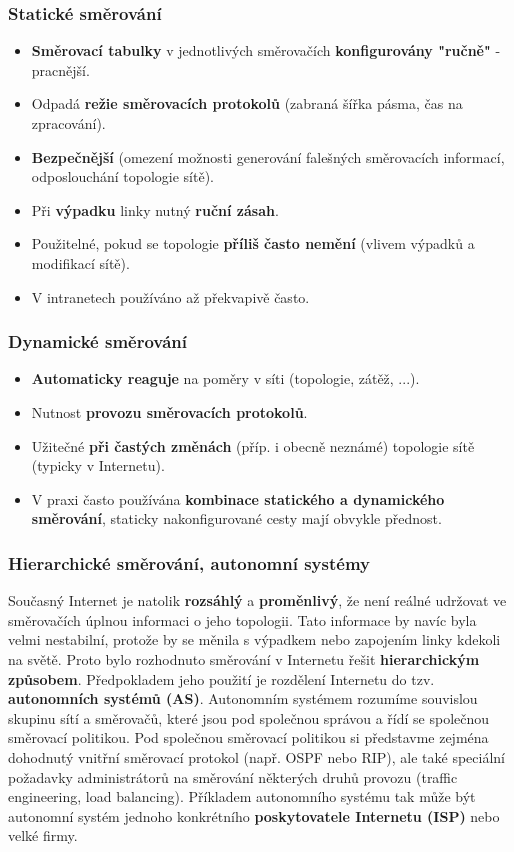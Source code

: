 \subsubsection{Statické směrování}
\begin{itemize}
\item \textbf{Směrovací tabulky} v jednotlivých směrovačích \textbf{konfigurovány "ručně"} - pracnější.
\item Odpadá \textbf{režie směrovacích protokolů} (zabraná šířka pásma, čas na zpracování).
\item \textbf{Bezpečnější} (omezení možnosti generování falešných směrovacích informací, odposlouchání topologie sítě).
\item Při \textbf{výpadku} linky nutný \textbf{ruční zásah}.
\item Použitelné, pokud se topologie \textbf{příliš často nemění} (vlivem výpadků a modifikací sítě).
\item V intranetech používáno až překvapivě často.
\end{itemize}

\subsubsection{Dynamické směrování}
\begin{itemize}
\item \textbf{Automaticky reaguje} na poměry v síti (topologie, zátěž, ...).
\item Nutnost\textbf{ provozu směrovacích protokolů}.
\item Užitečné \textbf{při častých změnách} (příp. i obecně neznámé) topologie sítě (typicky v Internetu).
\item V praxi často používána \textbf{kombinace statického a dynamického směrování}, staticky nakonfigurované cesty mají obvykle přednost.
\end{itemize}

\subsubsection{Hierarchické směrování, autonomní systémy}
Současný Internet je natolik \textbf{rozsáhlý} a \textbf{proměnlivý}, že není reálné udržovat ve směrovačích úplnou informaci o jeho topologii. Tato informace by navíc byla velmi nestabilní, protože by se měnila s výpadkem nebo zapojením linky kdekoli na světě. Proto bylo rozhodnuto směrování v Internetu řešit \textbf{hierarchickým způsobem}. Předpokladem jeho použití je rozdělení Internetu do tzv. \textbf{autonomních systémů (AS)}. Autonomním systémem rozumíme souvislou skupinu sítí a směrovačů, které jsou pod společnou správou a řídí se společnou směrovací politikou. Pod společnou směrovací politikou si představme zejména dohodnutý vnitřní směrovací protokol (např. OSPF nebo RIP), ale také speciální požadavky administrátorů na směrování některých druhů provozu (traffic engineering, load balancing). Příkladem autonomního systému tak může být autonomní systém jednoho konkrétního\textbf{ poskytovatele Internetu (ISP)} nebo velké firmy.


